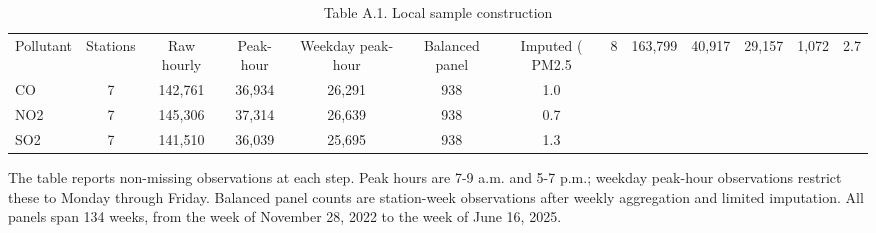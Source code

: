 \begin{table}[htbp]\centering
\begin{threeparttable}
\caption{Table A.1. Local sample construction}
\begin{tabular}{lcccccc}
\toprule
Pollutant & Stations & Raw hourly & Peak-hour & Weekday peak-hour & Balanced panel & Imputed (%
\midrule
PM2.5 & 8 & 163,799 & 40,917 & 29,157 & 1,072 & 2.7 \\
CO & 7 & 142,761 & 36,934 & 26,291 & 938 & 1.0 \\
NO2 & 7 & 145,306 & 37,314 & 26,639 & 938 & 0.7 \\
SO2 & 7 & 141,510 & 36,039 & 25,695 & 938 & 1.3 \\
\bottomrule
\end{tabular}
\begin{tablenotes}\footnotesize
\item The table reports non-missing observations at each step. Peak hours are 7-9 a.m. and 5-7 p.m.; weekday peak-hour observations restrict these to Monday through Friday. Balanced panel counts are station-week observations after weekly aggregation and limited imputation. All panels span 134 weeks, from the week of November 28, 2022 to the week of June 16, 2025.
\end{tablenotes}
\end{threeparttable}
\end{table}
